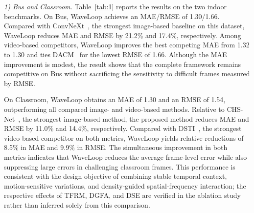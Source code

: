 \documentclass[lettersize,journal]{IEEEtran}
\begin{document}
\textit{1) Bus and Classroom.}
Table~\ref{tab:1} reports the results on the two indoor benchmarks. On Bus, WaveLoop achieves an MAE/RMSE of 1.30/1.66. Compared with ConvNeXt~\cite{liu2022convnet}, the strongest image-based baseline on this dataset, WaveLoop reduces MAE and RMSE by 21.2\% and 17.4\%, respectively. Among video-based competitors, WaveLoop improves the best competing MAE from 1.32 to 1.30 and ties DACM~\cite{ling2025dual} for the lowest RMSE of 1.66. Although the MAE improvement is modest, the result shows that the complete framework remains competitive on Bus without sacrificing the sensitivity to difficult frames measured by RMSE.

On Classroom, WaveLoop obtains an MAE of 1.30 and an RMSE of 1.54, outperforming all compared image- and video-based methods. Relative to CHS-Net~\cite{dai2023cross}, the strongest image-based method, the proposed method reduces MAE and RMSE by 11.0\% and 14.4\%, respectively. Compared with DSTI~\cite{ling2026dual}, the strongest video-based competitor on both metrics, WaveLoop yields relative reductions of 8.5\% in MAE and 9.9\% in RMSE. The simultaneous improvement in both metrics indicates that WaveLoop reduces the average frame-level error while also suppressing large errors in challenging classroom frames. This performance is consistent with the design objective of combining stable temporal context, motion-sensitive variations, and density-guided spatial-frequency interaction; the respective effects of TFRM, DGFA, and DSE are verified in the ablation study rather than inferred solely from this comparison.
\end{document}
